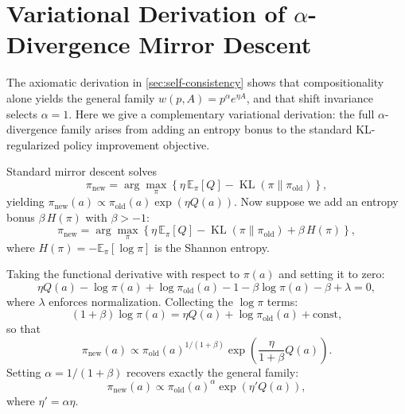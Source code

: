 \documentclass{article}
\theoremstyle{plain}
\theoremstyle{definition}
\theoremstyle{remark}
\newcommand{\E}{\mathbb{E}}
\DeclareMathOperator{\KL}{KL}
\begin{document}
\section{Variational Derivation of $\alpha$-Divergence Mirror Descent}
\label{app:alpha-divergence}

The axiomatic derivation in \cref{sec:self-consistency} shows that compositionality alone yields the general family $w(p, A) = p^\alpha e^{\eta A}$, and that shift invariance selects $\alpha = 1$.
Here we give a complementary variational derivation: the full $\alpha$-divergence family arises from adding an entropy bonus to the standard KL-regularized policy improvement objective.

Standard mirror descent solves
\begin{equation}
  \pi_{\mathrm{new}} = \arg\max_\pi \left\{ \eta\, \E_\pi[Q] - \KL(\pi \| \pi_{\mathrm{old}}) \right\},
\end{equation}
yielding $\pi_{\mathrm{new}}(a) \propto \pi_{\mathrm{old}}(a) \exp(\eta Q(a))$.
Now suppose we add an entropy bonus $\beta\, H(\pi)$ with $\beta > -1$:
\begin{equation}
  \pi_{\mathrm{new}} = \arg\max_\pi \left\{ \eta\, \E_\pi[Q] - \KL(\pi \| \pi_{\mathrm{old}}) + \beta\, H(\pi) \right\},
  \label{eq:alpha-objective}
\end{equation}
where $H(\pi) = -\E_\pi[\log \pi]$ is the Shannon entropy.

Taking the functional derivative with respect to $\pi(a)$ and setting it to zero:
\begin{equation}
  \eta Q(a) - \log \pi(a) + \log \pi_{\mathrm{old}}(a) - 1 - \beta \log \pi(a) - \beta + \lambda = 0,
\end{equation}
where $\lambda$ enforces normalization. Collecting the $\log \pi$ terms:
\begin{equation}
  (1 + \beta) \log \pi(a) = \eta Q(a) + \log \pi_{\mathrm{old}}(a) + \text{const},
\end{equation}
so that
\begin{equation}
  \pi_{\mathrm{new}}(a) \propto \pi_{\mathrm{old}}(a)^{1/(1+\beta)} \exp\!\left(\frac{\eta}{1+\beta} Q(a)\right).
\end{equation}
Setting $\alpha = 1/(1+\beta)$ recovers exactly the general family:
\begin{equation}
  \pi_{\mathrm{new}}(a) \propto \pi_{\mathrm{old}}(a)^\alpha \exp(\eta' Q(a)),
  \label{eq:alpha-tilt}
\end{equation}
where $\eta' = \alpha \eta$.
\end{document}
